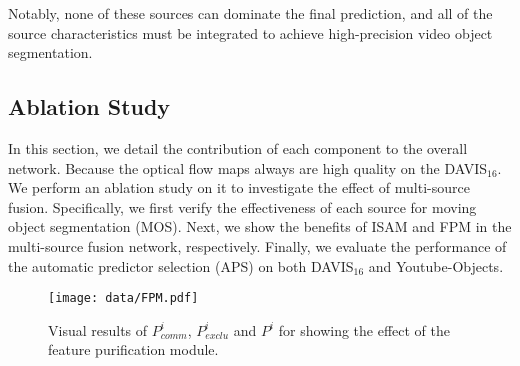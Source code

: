 \documentclass[sigconf]{acmart}
\begin{document}
 Notably, none of these sources can dominate the final prediction, and all of the source characteristics must be integrated to achieve high-precision video object segmentation.
\begin{table}
	\centering
	  \setlength{\abovecaptionskip}{3pt}
	\caption{Ablation study on the validation set of DAVIS$_{16}$.}
	\label{tab:Table4}
	\vspace{-8mm}
\end{table}
\subsection{Ablation Study}\label{sec:AbStd}
In this section, we detail the contribution of each component to the overall network. Because the optical flow maps always are high quality on the DAVIS$_{16}$. 
We perform an ablation study on it to investigate the effect of multi-source fusion.
Specifically, we first verify the effectiveness of each source for moving object segmentation (MOS). Next, we show the benefits of ISAM and FPM in the multi-source fusion network, respectively. Finally, we evaluate the performance of the automatic predictor selection (APS) on both DAVIS$_{16}$ and Youtube-Objects. 
\begin{figure}[t]
\texttt{[image: data/FPM.pdf]}\\
        \centering
\caption{Visual results  of  ${P}_{comm}^i$, ${P}_{exclu}^i$ and ${P}^i$ for  showing  the  effect of the feature purification module.}
\label{fig:visual_fpm}
\vspace{-5mm}
\end{figure} 
\end{document}
